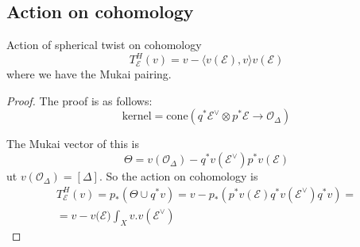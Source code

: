 \subsection{Action on cohomology}

\begin{proposition}{Action of spherical twist on cohomology}{}
    $$T_{\mathcal{E}}^H(v)=v-\langle v(\mathcal{E}),v\rangle v(\mathcal{E})$$
where we have the Mukai pairing.
\end{proposition}
 \begin{proof}
 The proof is as follows: 
 $$\text{kernel}=\mathrm{cone}(q^*\mathcal{E}^\lor\otimes p^* \mathcal{E}\xrightarrow{}\mathcal{O}_{\Delta})$$
 
 The Mukai vector of this is $$\Theta=v(\mathcal{O}_{\Delta})-q^*v(\mathcal{E}^\lor)p^*v(\mathcal{E})$$
 ut $v(\mathcal{O}_{\Delta})=[\Delta]$. So the action on cohomology is
\begin{gather*}
T_{\mathcal{E}}^H(v)=p_{*}(\Theta \cup q^*v)=v-p_{*}(p^*v(\mathcal{E})q^*v(\mathcal{E}^\lor)q^* v)=\\=v-v(\mathcal{E)}\int _{X} v.v(\mathcal{E}^\lor)
\end{gather*}

\end{proof}



